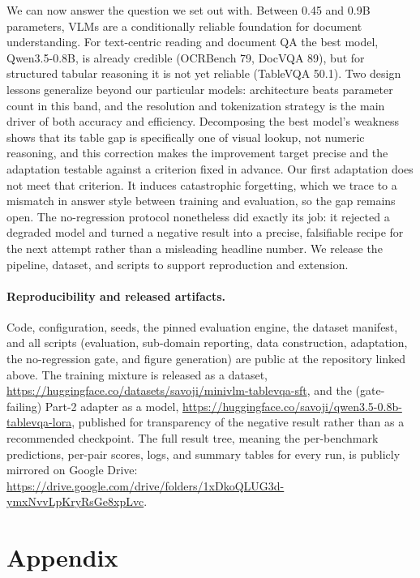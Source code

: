 \documentclass{article}
\begin{document}
We can now answer the question we set out with. Between 0.45 and 0.9B
parameters, VLMs are a conditionally reliable foundation for document
understanding. For text-centric reading and document QA the best model,
Qwen3.5-0.8B, is already credible (OCRBench 79, DocVQA 89), but for structured
tabular reasoning it is not yet reliable (TableVQA 50.1). Two design lessons
generalize beyond our particular models: architecture beats parameter count in
this band, and the resolution and tokenization strategy is the main driver of
both accuracy and efficiency. Decomposing the best model's weakness shows that
its table gap is specifically one of visual lookup, not numeric reasoning, and
this correction makes the improvement target precise and the adaptation testable
against a criterion fixed in advance. Our first adaptation does not meet that
criterion. It induces catastrophic forgetting, which we trace to a mismatch in
answer style between training and evaluation, so the gap remains open. The
no-regression protocol nonetheless did exactly its job: it rejected a degraded
model and turned a negative result into a precise, falsifiable recipe for the
next attempt rather than a misleading headline number. We release the pipeline,
dataset, and scripts to support reproduction and extension.

\paragraph{Reproducibility and released artifacts.}
Code, configuration, seeds, the pinned evaluation engine, the dataset manifest,
and all scripts (evaluation, sub-domain reporting, data construction,
adaptation, the no-regression gate, and figure generation) are public at the
repository linked above. The training mixture is released as a dataset,
\url{https://huggingface.co/datasets/savoji/minivlm-tablevqa-sft}, and the
(gate-failing) Part-2 adapter as a model,
\url{https://huggingface.co/savoji/qwen3.5-0.8b-tablevqa-lora}, published for
transparency of the negative result rather than as a recommended checkpoint. The
full result tree, meaning the per-benchmark predictions, per-pair scores, logs,
and summary tables for every run, is publicly mirrored on Google Drive:
\url{https://drive.google.com/drive/folders/1xDkoQLUG3d-ymxNvvLpKryRsGe8xpLvc}.




\appendix
\section{Appendix}
\end{document}
